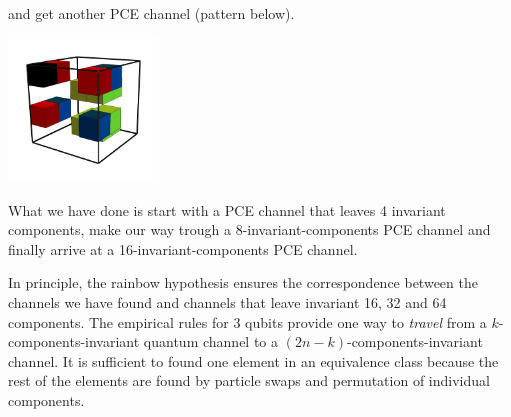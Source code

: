 \documentclass[11pt,dvipsnames]{article} %
\newcommand{\1}{\mathds{1}}
\begin{document}
and get another PCE channel (pattern below).
\begin{center}
	\includegraphics[width=4cm]{img/3q-8c}
\end{center}
What we have done is start with a PCE channel that leaves 4 invariant
components, make our way trough a 8-invariant-components PCE channel and 
finally arrive at a 16-invariant-components PCE channel.

In principle, the rainbow hypothesis ensures the correspondence between  
the channels we have found and channels that leave invariant 16, 32 and 64
components. The empirical rules for 3 qubits provide one way to \textit{travel}
from a $k$-components-invariant quantum channel to a
$(2n-k)$-components-invariant channel.
It is sufficient to found one element in an 
equivalence class because the rest of the elements are found 
by particle swaps and permutation of individual components.


\end{document}
